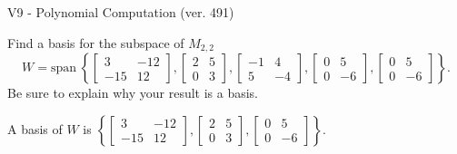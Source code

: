 \begin{exercise}
  \begin{exerciseTitle}V9 - Polynomial Computation (ver. 491)\end{exerciseTitle}
  \begin{exerciseStatement}
    Find a basis for the subspace of \(M_{2,2}\) 
\[W=\mathrm{span}\ \left\{\left[\begin{array}{cc}
3 & -12 \\
-15 & 12
\end{array}\right] , \left[\begin{array}{cc}
2 & 5 \\
0 & 3
\end{array}\right] , \left[\begin{array}{cc}
-1 & 4 \\
5 & -4
\end{array}\right] , \left[\begin{array}{cc}
0 & 5 \\
0 & -6
\end{array}\right] , \left[\begin{array}{cc}
0 & 5 \\
0 & -6
\end{array}\right]\right\}.\]
 Be sure to explain why your result is a basis.


  \end{exerciseStatement}
  \begin{exerciseAnswer}
   A basis of \(W\) is  \(\left\{\left[\begin{array}{cc}
3 & -12 \\
-15 & 12
\end{array}\right] , \left[\begin{array}{cc}
2 & 5 \\
0 & 3
\end{array}\right] , \left[\begin{array}{cc}
0 & 5 \\
0 & -6
\end{array}\right]\right\}\).
  


  \end{exerciseAnswer}
\end{exercise}